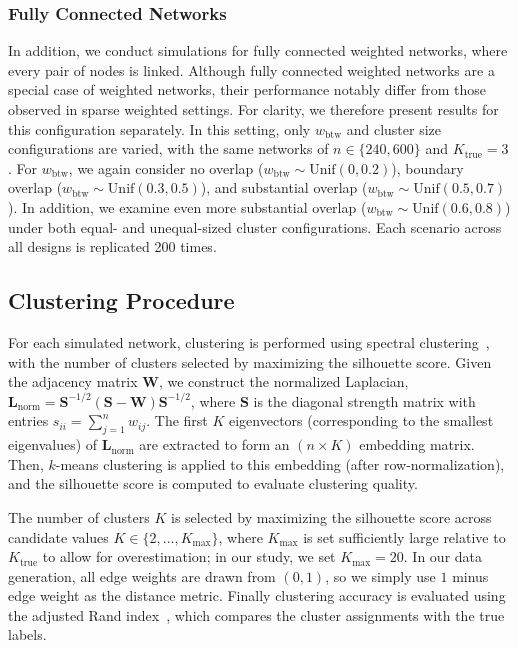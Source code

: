 \documentclass[12pt, titlepage, reqno]{article}
\begin{document}
\subsubsection{Fully Connected Networks}
\label{sec:fully}


In addition, we conduct simulations for fully connected weighted 
networks, where every pair of nodes is linked. Although fully 
connected weighted networks are a special case of weighted networks, 
their performance notably differ from those observed in sparse 
weighted settings. For clarity, we therefore present results for this 
configuration separately. In this setting, only 
$w_\text{btw}$ and cluster size configurations are varied, with the 
same networks of $n \in \{240,600\}$ and $K_\text{true} = 3$. For 
$w_\text{btw}$, we again consider no overlap ($w_\text{btw} \sim 
\text{Unif}(0,0.2)$), boundary overlap ($w_\text{btw} \sim 
\text{Unif}(0.3,0.5)$), and substantial overlap ($w_\text{btw} \sim 
\text{Unif}(0.5,0.7)$). In addition, we examine even more substantial 
overlap ($w_\text{btw} \sim \text{Unif}(0.6,0.8)$) under both equal- 
and unequal-sized cluster configurations. Each scenario across all 
designs is replicated 200 times.


\subsection{Clustering Procedure}
\label{sec:clustering}


For each simulated network, clustering is performed using spectral 
clustering~\citep{vonluxburg2007atutorial}, with the number of 
clusters selected by maximizing the silhouette score. Given the 
adjacency matrix $\bm{W}$, we construct the normalized Laplacian,
$\bm{L}_{\text{norm}} = \bm{S}^{-1/2}(\bm{S} - \bm{W})\bm{S}^{-1/2}$,
where $\bm{S}$ is the diagonal strength matrix with entries $s_{ii} = 
\sum_{j=1}^n w_{ij}$. The first $K$ eigenvectors (corresponding to 
the smallest eigenvalues) of $\bm{L}_{\text{norm}}$ are extracted to 
form an $(n \times K)$ embedding matrix. Then, $k$-means clustering 
is applied to this embedding (after row-normalization), and the 
silhouette score is computed to 
evaluate clustering quality.


The number of clusters $K$ is selected by maximizing the silhouette 
score across candidate values $K \in \{2, \ldots, K_{\text{max}}\}$, 
where $K_{\text{max}}$ is set sufficiently large relative to 
$K_{\text{true}}$ to allow for overestimation; in our study, we set 
$K_{\text{max}} = 20$. In our data generation, all edge weights are 
drawn from $(0, 1)$, so we simply use $1$ minus edge weight as the 
distance metric. Finally clustering accuracy is evaluated using the 
adjusted Rand index~\citep[ARI,][]{hubert1985comparing}, which 
compares the cluster assignments with the true labels.
\end{document}
